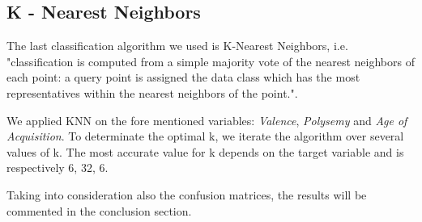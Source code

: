 \documentclass[a4paper,11pt,dvipsnames]{article}
\begin{document}
\subsection{K - Nearest Neighbors}
The last classification algorithm we used is K-Nearest Neighbors, i.e. "classification is computed from a simple majority vote of the nearest neighbors of each point: a query point is assigned the data class which has the most representatives within the nearest neighbors of the point."\cite{JMLR:v12:pedregosa11a}. 

We applied KNN on the fore mentioned variables: \textit{Valence}, \textit{Polysemy} and \textit{Age of Acquisition}. To determinate the optimal k, we iterate the algorithm over several values of k. The most accurate value for k depends on the target variable and is respectively 6, 32, 6. 

Taking into consideration also the confusion matrices, the results will be commented in the conclusion section.
\end{document}
